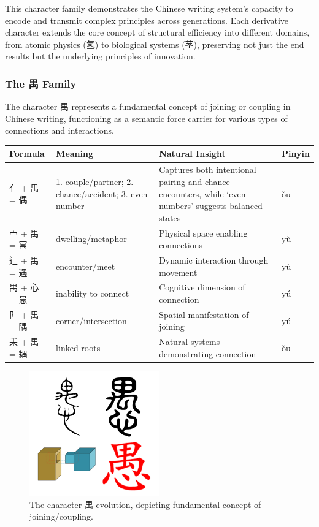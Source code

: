 \documentclass[11pt,letterpaper]{article}
\begin{document}
This character family demonstrates the Chinese writing system's capacity
to encode and transmit complex principles across generations. Each
derivative character extends the core concept of structural efficiency
into different domains, from atomic physics (氢) to biological systems
(茎), preserving not just the end results but the underlying principles
of innovation.

\subsubsection{The 禺 Family}\label{the-ux79ba-family}

The character 禺 represents a fundamental concept of joining or coupling
in Chinese writing, functioning as a semantic force carrier for various
types of connections and interactions.

\begin{longtable}{|p{3cm}|p{3cm}|p{6cm}|p{2cm}|}
\hline
\textbf{Formula} & \textbf{Meaning} & \textbf{Natural Insight} & \textbf{Pinyin} \\
\hline
亻 + 禺 = 偶 & 1. couple/partner; 2. chance/accident; 3. even number &
Captures both intentional pairing and chance encounters, while `even
numbers' suggests balanced states & ǒu \\
\hline
宀 + 禺 = 寓 & dwelling/metaphor & Physical space enabling connections &
yù \\
\hline
辶 + 禺 = 遇 & encounter/meet & Dynamic interaction through movement &
yù \\
\hline
禺 + 心 = 愚 & inability to connect & Cognitive dimension of connection
& yú \\
\hline
阝 + 禺 = 隅 & corner/intersection & Spatial manifestation of joining &
yú \\
\hline
耒 + 禺 = 耦 & linked roots & Natural systems demonstrating connection &
ǒu \\
\hline
\end{longtable}

\begin{figure}
\centering
\includegraphics[width=0.5\textwidth]{./images/zi_join.png}
\caption{The character 禺 evolution, depicting fundamental concept of
joining/coupling.}
\end{figure}
\end{document}
